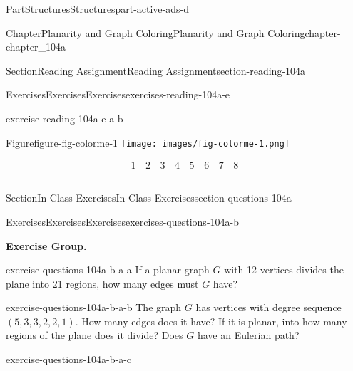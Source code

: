 \documentclass[oneside,10pt,]{book}
\numberwithin{equation}{section}
\begin{document}
\begin{partptx}{Part}{Structures}{}{Structures}{}{}{part-active-ads-d}
\begin{chapterptx}{Chapter}{Planarity and Graph Coloring}{}{Planarity and Graph Coloring}{}{}{chapter-chapter_104a}
\begin{sectionptx}{Section}{Reading Assignment}{}{Reading Assignment}{}{}{section-reading-104a}
\begin{exercises-subsection-numberless}{Exercises}{Exercises}{}{Exercises}{}{}{exercises-reading-104a-e}
\begin{exercisegroup}
\begin{divisionexerciseeg}{2}{}{}{exercise-reading-104a-e-a-b}
\begin{sidebyside}{2}{0}{0}{0}
\begin{sbspanel}{0.5}
\begin{panelfigureptx}{Figure}{}{figure-fig-colorme-1}{}
\texttt{[image: images/fig-colorme-1.png]}
\tcblower
\end{panelfigureptx}%
\end{sbspanel}%
\begin{sbspanel}{0.5}%
%
\begin{equation*}
\begin{array}{cccccccc}
1 & 2 & 3 & 4 & 5 & 6 & 7 & 8 \\
\_\_ & \_\_ & \_\_ & \_\_ & \_\_ &
\_\_ & \_\_ & \_\_ \\
\end{array}
\end{equation*}
%
\end{sbspanel}%
\end{sidebyside}%
\end{divisionexerciseeg}%
\end{exercisegroup}
\par\medskip\noindent
\end{exercises-subsection-numberless}
\end{sectionptx}
%
%
\typeout{************************************************}
\typeout{************************************************}
%
\begin{sectionptx}{Section}{In-Class Exercises}{}{In-Class Exercises}{}{}{section-questions-104a}
%
%
\typeout{************************************************}
\typeout{************************************************}
%
\begin{exercises-subsection-numberless}{Exercises}{Exercises}{}{Exercises}{}{}{exercises-questions-104a-b}
\par\medskip\noindent%
\textbf{Exercise Group.}\space\space%
\begin{exercisegroup}
\begin{divisionexerciseeg}{1}{}{}{exercise-questions-104a-b-a-a}%
If a planar graph \(G\) with 12 vertices divides the plane into 21 regions, how many edges must \(G\) have?%
\end{divisionexerciseeg}%
\begin{divisionexerciseeg}{2}{}{}{exercise-questions-104a-b-a-b}%
%
The graph \(G\) has vertices with degree sequence \((5, 3, 3, 2, 2, 1)\). How many edges does it have? If it is planar, into how many regions of the plane does it divide?  Does \(G\) have an Eulerian path?%
\end{divisionexerciseeg}%
\begin{divisionexerciseeg}{3}{}{}{exercise-questions-104a-b-a-c}%

\end{divisionexerciseeg}
\end{exercisegroup}
\end{exercises-subsection-numberless}
\end{sectionptx}
\end{chapterptx}
\end{partptx}
\end{document}
